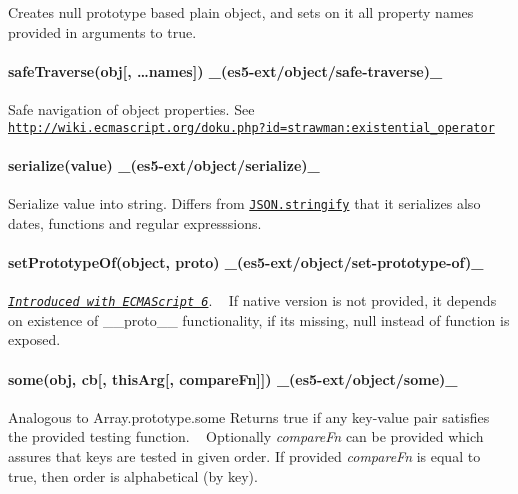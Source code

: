 Creates {\ttfamily null} prototype based plain object, and sets on it all property names provided in arguments to true.

\paragraph*{safe\+Traverse(obj\mbox{[}, …names\mbox{]}) \+\_\+(es5-\/ext/object/safe-\/traverse)\+\_\+}

Safe navigation of object properties. See \href{http://wiki.ecmascript.org/doku.php?id=strawman:existential_operator}{\tt http\+://wiki.\+ecmascript.\+org/doku.\+php?id=strawman\+:existential\+\_\+operator}

\paragraph*{serialize(value) \+\_\+(es5-\/ext/object/serialize)\+\_\+}

Serialize value into string. Differs from \href{https://developer.mozilla.org/en-US/docs/Web/JavaScript/Reference/Global_Objects/JSON/stringify}{\tt J\+S\+O\+N.\+stringify} that it serializes also dates, functions and regular expresssions.

\paragraph*{set\+Prototype\+Of(object, proto) \+\_\+(es5-\/ext/object/set-\/prototype-\/of)\+\_\+}

\href{http://people.mozilla.org/~jorendorff/es6-draft.html#sec-object.setprototypeof}{\tt {\itshape Introduced with E\+C\+M\+A\+Script 6}}. ~\newline
If native version is not provided, it depends on existence of {\ttfamily \+\_\+\+\_\+proto\+\_\+\+\_\+} functionality, if it\textquotesingle{}s missing, {\ttfamily null} instead of function is exposed.

\paragraph*{some(obj, cb\mbox{[}, this\+Arg\mbox{[}, compare\+Fn\mbox{]}\mbox{]}) \+\_\+(es5-\/ext/object/some)\+\_\+}

Analogous to Array.\+prototype.\+some Returns true if any key-\/value pair satisfies the provided testing function. ~\newline
Optionally {\itshape compare\+Fn} can be provided which assures that keys are tested in given order. If provided {\itshape compare\+Fn} is equal to {\ttfamily true}, then order is alphabetical (by key).


